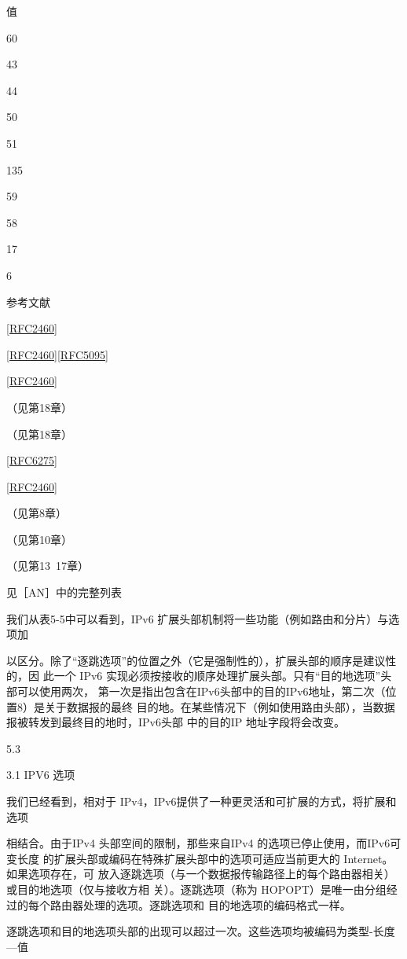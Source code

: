 值

60

43

44

50

51

135

59

58

17

6

参考文献

\href{https://www.rfc-editor.org/rfc/rfc2460}{[RFC2460]}

\href{https://www.rfc-editor.org/rfc/rfc2460}{[RFC2460]}\href{https://www.rfc-editor.org/rfc/rfc5095}{[RFC5095]}

\href{https://www.rfc-editor.org/rfc/rfc2460}{[RFC2460]}

（见第18章）

（见第18章）

\href{https://www.rfc-editor.org/rfc/rfc6275}{[RFC6275]}

\href{https://www.rfc-editor.org/rfc/rfc2460}{[RFC2460]}

（见第8章）

（见第10章）

（见第13~17章）

见［AN］中的完整列表

我们从表5-5中可以看到，IPv6 扩展头部机制将一些功能（例如路由和分片）与选项加

以区分。除了“逐跳选项”的位置之外（它是强制性的），扩展头部的顺序是建议性的，因
此一个 IPv6 实现必须按接收的顺序处理扩展头部。只有“目的地选项”头部可以使用两次，
第一次是指出包含在IPv6头部中的目的IPv6地址，第二次（位置8）是关于数据报的最终
目的地。在某些情况下（例如使用路由头部），当数据报被转发到最终目的地时，IPv6头部
中的目的IP 地址字段将会改变。

5.3

3.1 IPV6 选项

我们已经看到，相对于 IPv4，IPv6提供了一种更灵活和可扩展的方式，将扩展和选项

相结合。由于IPv4 头部空间的限制，那些来自IPv4 的选项已停止使用，而IPv6可变长度
的扩展头部或编码在特殊扩展头部中的选项可适应当前更大的 Internet。如果选项存在，可
放入逐跳选项（与一个数据报传输路径上的每个路由器相关）或目的地选项（仅与接收方相
关）。逐跳选项（称为 HOPOPT）是唯一由分组经过的每个路由器处理的选项。逐跳选项和
目的地选项的编码格式一样。

逐跳选项和目的地选项头部的出现可以超过一次。这些选项均被编码为类型-长度—值

